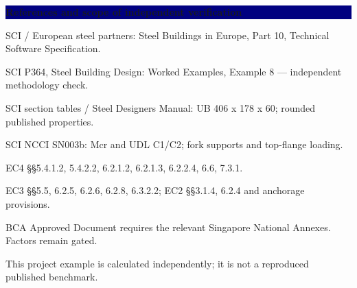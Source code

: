 \documentclass[a4paper,10pt]{article}
\newcommand{\sect}[1]{\Needspace{30mm}\vspace{10pt}\noindent\colorbox{navy}{\parbox{\dimexpr\linewidth-2\fboxsep}{\vspace{4pt}\color{white}\large\bfseries #1\vspace{4pt}}}\par\vspace{3pt}}
\begin{document}
\sect{References and scope of independent verification}
{\small\color{muted}SCI / European steel partners: Steel Buildings in Europe, Part 10, Technical Software Specification.}\par
{\small\color{muted}SCI P364, Steel Building Design: Worked Examples, Example 8 — independent methodology check.}\par
{\small\color{muted}SCI section tables / Steel Designers Manual: UB 406 x 178 x 60; rounded published properties.}\par
{\small\color{muted}SCI NCCI SN003b: Mcr and UDL C1/C2; fork supports and top-flange loading.}\par
{\small\color{muted}EC4 §§5.4.1.2, 5.4.2.2, 6.2.1.2, 6.2.1.3, 6.2.2.4, 6.6, 7.3.1.}\par
{\small\color{muted}EC3 §§5.5, 6.2.5, 6.2.6, 6.2.8, 6.3.2.2; EC2 §§3.1.4, 6.2.4 and anchorage provisions.}\par
{\small\color{muted}BCA Approved Document requires the relevant Singapore National Annexes. Factors remain gated.}\par
{\small\color{muted}This project example is calculated independently; it is not a reproduced published benchmark.}\par
\end{document}
